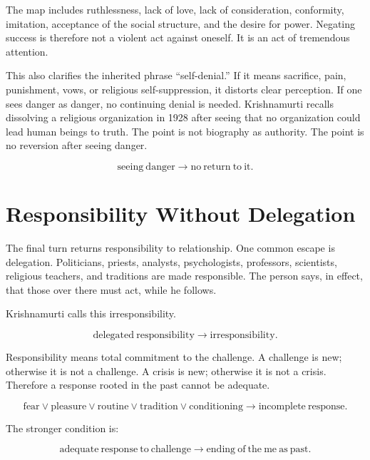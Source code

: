 \documentclass[11pt,oneside]{book}
\begin{document}
The map includes ruthlessness, lack of love, lack of consideration, conformity, imitation, acceptance of the social structure, and the desire for power. Negating success is therefore not a violent act against oneself. It is an act of tremendous attention.

This also clarifies the inherited phrase ``self-denial.'' If it means sacrifice, pain, punishment, vows, or religious self-suppression, it distorts clear perception. If one sees danger as danger, no continuing denial is needed. Krishnamurti recalls dissolving a religious organization in 1928 after seeing that no organization could lead human beings to truth. The point is not biography as authority. The point is no reversion after seeing danger.

\begin{equation}
\mathrm{seeing\ danger}
\longrightarrow
\mathrm{no\ return\ to\ it}.
\end{equation}

\section{Responsibility Without Delegation}

The final turn returns responsibility to relationship. One common escape is delegation. Politicians, priests, analysts, psychologists, professors, scientists, religious teachers, and traditions are made responsible. The person says, in effect, that those over there must act, while he follows.

Krishnamurti calls this irresponsibility.

\begin{equation}
\mathrm{delegated\ responsibility}
\longrightarrow
\mathrm{irresponsibility}.
\end{equation}

Responsibility means total commitment to the challenge. A challenge is new; otherwise it is not a challenge. A crisis is new; otherwise it is not a crisis. Therefore a response rooted in the past cannot be adequate.

\begin{equation}
\mathrm{fear}
\lor
\mathrm{pleasure}
\lor
\mathrm{routine}
\lor
\mathrm{tradition}
\lor
\mathrm{conditioning}
\longrightarrow
\mathrm{incomplete\ response}.
\end{equation}

The stronger condition is:

\begin{equation}
\mathrm{adequate\ response\ to\ challenge}
\longrightarrow
\mathrm{ending\ of\ the\ me\ as\ past}.
\end{equation}
\end{document}
